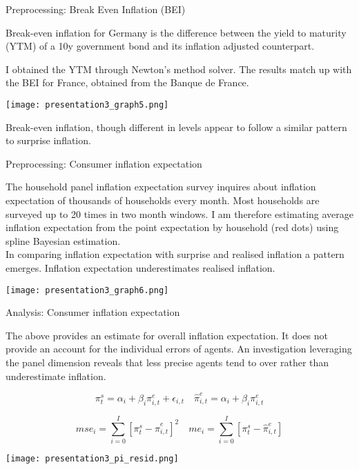 \documentclass[9pt]{beamer}
\begin{document}
	
	\begin{frame}{Preprocessing: Break Even Inflation (BEI)}
		
		Break-even inflation for Germany is the difference between the yield to maturity (YTM) of a 10y government bond and its inflation adjusted counterpart.
		
		I obtained the YTM through Newton's method solver. The results match up with the BEI for France, obtained from the Banque de France.
		
		\begin{center}
			\texttt{[image: presentation3\_graph5.png]}
		\end{center}
		
		Break-even inflation, though different in levels appear to follow a similar pattern to surprise inflation.
		
	\end{frame}

	\begin{frame}{Preprocessing: Consumer inflation expectation}
		
		The household panel inflation expectation survey inquires about inflation expectation of thousands of households every month. Most households are surveyed up to 20 times in two month windows. 
		I am therefore estimating average inflation expectation from the point expectation by household (red dots) using spline Bayesian estimation. \\
				
		In comparing inflation expectation with surprise and realised inflation a pattern emerges. Inflation expectation underestimates realised inflation. 
		
		\begin{center}
			\texttt{[image: presentation3\_graph6.png]}
		\end{center}
	
	\end{frame}

	\begin{frame}{Analysis: Consumer inflation expectation}
		
	The above provides an estimate for overall inflation expectation. It does not provide an account for the individual errors of agents.
	An investigation leveraging the panel dimension reveals that less precise agents tend to over rather than underestimate inflation.
	
		\[
			\pi^s_t = \alpha_i + \beta_i \pi^e_{i,t} + \epsilon_{i,t} \quad \hat{\pi}_{i,t}^e = \alpha_i + \beta_i \pi^e_{i,t}
		\]
		
		\[
			mse_i = \sum_{i=0}^{I} \left[\pi^s_t - \hat{\pi}_{i,t}^e \right]^2
			\quad
			me_i =  \sum_{i=0}^{I} \left[\pi^s_t - \hat{\pi}_{i,t}^e \right]
		\]
		
		\begin{center}
			\texttt{[image: presentation3\_pi\_resid.png]}
		\end{center}
	\end{frame}

	

	

	
\end{document}
